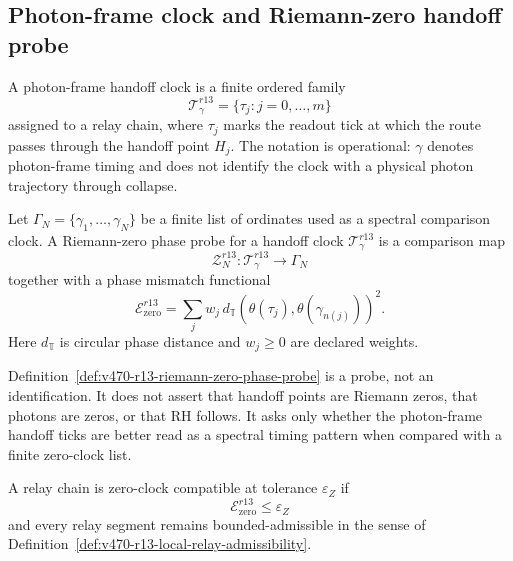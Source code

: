 \subsection{Photon-frame clock and Riemann-zero handoff probe}
\label{subsec:v470-r13-photon-frame-zero-clock-probe}

\begin{definition}
\label{def:v470-r13-photon-frame-handoff-clock}
A photon-frame handoff clock is a finite ordered family
\[
\mathcal T_{\gamma}^{r13}=\{\tau_j:j=0,\ldots,m\}
\]
assigned to a relay chain, where \(\tau_j\) marks the readout tick at which the
route passes through the handoff point \(H_j\).  The notation is operational:
\(\gamma\) denotes photon-frame timing and does not identify the clock with a
physical photon trajectory through collapse.
\end{definition}

\begin{definition}
\label{def:v470-r13-riemann-zero-phase-probe}
Let \(\Gamma_N=\{\gamma_1,\ldots,\gamma_N\}\) be a finite list of ordinates used
as a spectral comparison clock.  A Riemann-zero phase probe for a handoff clock
\(\mathcal T_{\gamma}^{r13}\) is a comparison map
\[
\mathcal Z_{N}^{r13}:\mathcal T_{\gamma}^{r13}
\longrightarrow
\Gamma_N
\]
together with a phase mismatch functional
\[
\mathcal E_{\mathrm{zero}}^{r13}
=
\sum_j
w_j\,d_{\mathbb T}\!\left(\theta(\tau_j),\theta(\gamma_{n(j)})\right)^2.
\]
Here \(d_{\mathbb T}\) is circular phase distance and \(w_j\ge0\) are declared
weights.
\end{definition}

\begin{remark}
Definition~\ref{def:v470-r13-riemann-zero-phase-probe} is a probe, not an
identification.  It does not assert that handoff points are Riemann zeros, that
photons are zeros, or that RH follows.  It asks only whether the photon-frame
handoff ticks are better read as a spectral timing pattern when compared with a
finite zero-clock list.
\end{remark}

\begin{definition}
\label{def:v470-r13-zero-clock-relay-compatibility}
A relay chain is zero-clock compatible at tolerance \(\varepsilon_Z\) if
\[
\mathcal E_{\mathrm{zero}}^{r13}\le \varepsilon_Z
\]
and every relay segment remains bounded-admissible in the sense of
Definition~\ref{def:v470-r13-local-relay-admissibility}.
\end{definition}

